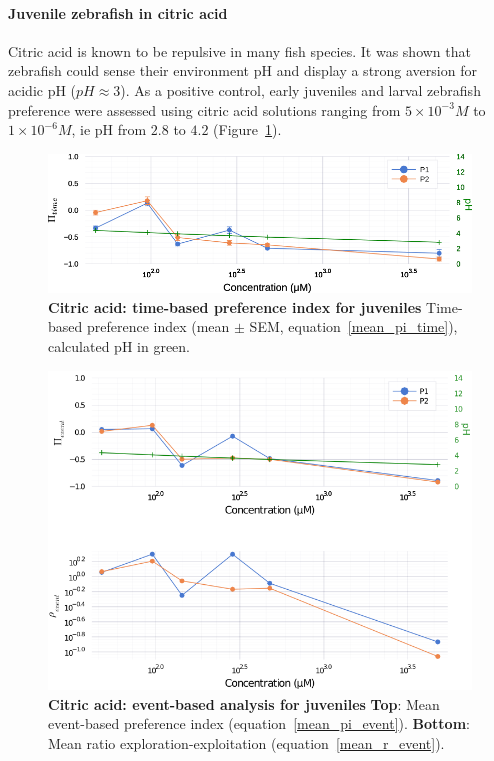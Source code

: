   \paragraph{Juvenile zebrafish in citric acid}
  Citric acid is known to be repulsive in many fish species. It was shown that zebrafish could sense their environment pH \cite{abreu2016acute,abreu2016behavioral} and display a strong aversion for acidic pH ($pH \approx 3$). As a positive control, early juveniles and larval zebrafish preference were assessed using citric acid solutions ranging from $5 \times 10^{-3} M$ to $1 \times 10^{-6} M$, ie pH from $2.8$ to $4.2$ (Figure~\ref{citric_acid}).
    \begin{figure}[h!]
      \centering
      \includegraphics[width=1\textwidth]{part_2/assets/citricacid.png}
      \caption{\textbf{Citric acid: time-based preference index for juveniles} Time-based preference index (mean $\pm$ SEM, equation~\ref{mean_pi_time}), calculated pH in green.}
      \label{citric_acid}
    \end{figure}
    \begin{figure}[h!]
      \centering
      \includegraphics[width=1\textwidth]{part_2/assets/citricacid_event.png}
      \caption{\textbf{Citric acid: event-based analysis for juveniles} \textbf{Top}: Mean event-based preference index (equation~\ref{mean_pi_event}). \textbf{Bottom}: Mean ratio exploration-exploitation (equation~\ref{mean_r_event}).}
      \label{citric_acid_event}
    \end{figure}

